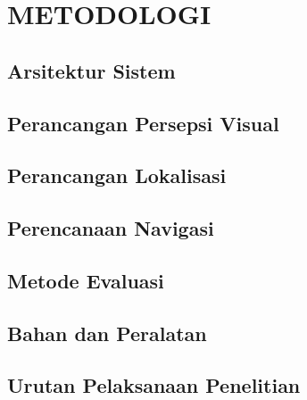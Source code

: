 \chapter{METODOLOGI}
\label{chap:desainimplementasi}

\section{Arsitektur Sistem}
\label{sec:arsitektur_sistem}


\section{Perancangan Persepsi Visual}
\label{sec:persepsi_visual}


\section{Perancangan Lokalisasi}
\label{sec:lokalisasi}


\section{Perencanaan Navigasi}
\label{sec:navigasi}


\section{Metode Evaluasi}
\label{sec:metode_evaluasi}


\section{Bahan dan Peralatan}
\label{sec:bahan_dan_peralatan}


\section{Urutan Pelaksanaan Penelitian}
\label{sec:jadwal_penelitian}

